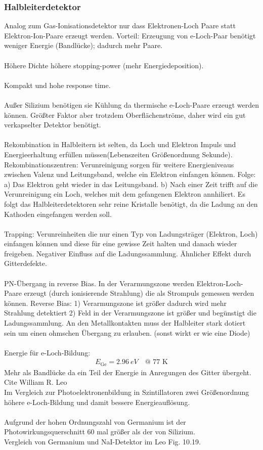 \documentclass[11pt, a4paper]{article}
\numberwithin{equation}{section}
\begin{document}
\subsubsection{Halbleiterdetektor}
Analog zum Gas-Ionisationsdetektor nur dass Elektronen-Loch Paare statt Elektron-Ion-Paare erzeugt werden.
Vorteil: Erzeugung von e-Loch-Paar benötigt weniger Energie (Bandlücke); dadurch mehr Paare.\\
\\
Höhere Dichte höhere stopping-power (mehr Energiedeposition).\\
\\
Kompakt und hohe response time.\\
\\
Außer Silizium benötigen sie Kühlung da thermische e-Loch-Paare erzeugt werden können. Größter Faktor aber trotzdem Oberflächenströme, daher wird ein gut verkapselter Detektor benötigt.\\
\\
Rekombination in Halbleitern ist selten, da Loch und Elektron Impuls und Energieerhaltung erfüllen müssen(Lebenszeiten Größenordnung Sekunde).
Rekombinationszentren: Verunreinigung sorgen für weitere Energieniveaus zwischen Valenz und Leitungsband, welche ein Elektron einfangen können. Folge: a) Das Elektron geht wieder in das Leitungsband. b) Nach einer Zeit trifft auf die Verunreinigung ein Loch, welches mit dem gefangenen Elektron annhiliert.
Es folgt das Halbleiterdetektoren sehr reine Kristalle benötigt, da die Ladung an den Kathoden eingefangen werden soll.\\
\\
Trapping: Verunreinheiten die nur einen Typ von Ladungsträger (Elektron, Loch) einfangen können und diese für eine gewisse Zeit halten und danach wieder freigeben. Negativer Einfluss auf die Ladungssammlung.
Ähnlicher Effekt durch Gitterdefekte.\\
\\
PN-Übergang in reverse Bias. In der Verarmungszone werden Elektron-Loch-Paare erzeugt (durch ionisierende Strahlung) die als Strompuls gemessen werden können. Reverse Bias: 1) Verarmungszone ist größer dadurch wird mehr Strahlung detektiert 2) Feld in der Verarmungszone ist größer und begünstigt die Ladungssammlung. An den Metallkontakten muss der Halbleiter stark dotiert sein um einen ohmschen Übergang zu erlauben. (sonst wirkt er wie eine Diode)\\
\\
Energie für e-Loch-Bildung:
\begin{align}
	E_\mathrm{Ge} = \SI{2.96}{eV} \quad \text{@ 77 K}
\end{align}
Mehr als Bandlücke da ein Teil der Energie in Anregungen des Gitter übergeht.
Cite William R. Leo\\
Im Vergleich zur Photoelektronenbildung in Szintillatoren zwei Größenordnung höhere e-Loch-Bildung und damit bessere Energieauflösung.\\
\\
Aufgrund der hohen Ordnungszahl von Germanium ist der Photowirkungsquerschnitt 60 mal größer als der von Silizium.\\
Vergleich von Germanium und NaI-Detektor im Leo Fig. 10{.}19.
\end{document}
